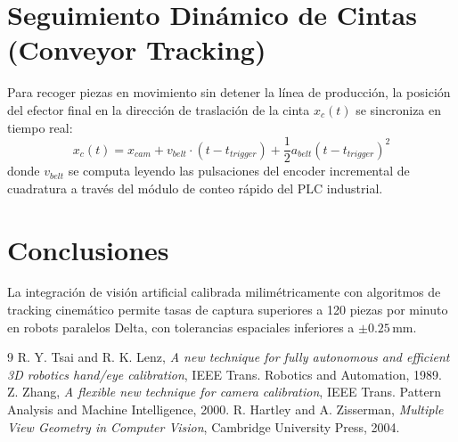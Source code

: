 \documentclass[11pt,a4paper]{article}
\begin{document}
\section{Seguimiento Dinámico de Cintas (Conveyor Tracking)}
Para recoger piezas en movimiento sin detener la línea de producción, la posición del efector final en la dirección de traslación de la cinta $x_c(t)$ se sincroniza en tiempo real:
\begin{equation}
x_c(t) = x_{cam} + v_{belt} \cdot (t - t_{trigger}) + \frac{1}{2} a_{belt} (t - t_{trigger})^2
\end{equation}
donde $v_{belt}$ se computa leyendo las pulsaciones del encoder incremental de cuadratura a través del módulo de conteo rápido del PLC industrial.

\section{Conclusiones}
La integración de visión artificial calibrada milimétricamente con algoritmos de tracking cinemático permite tasas de captura superiores a 120 piezas por minuto en robots paralelos Delta, con tolerancias espaciales inferiores a $\pm 0.25\,\text{mm}$.

\begin{thebibliography}{9}
 R. Y. Tsai and R. K. Lenz, \textit{A new technique for fully autonomous and efficient 3D robotics hand/eye calibration}, IEEE Trans. Robotics and Automation, 1989.
 Z. Zhang, \textit{A flexible new technique for camera calibration}, IEEE Trans. Pattern Analysis and Machine Intelligence, 2000.
 R. Hartley and A. Zisserman, \textit{Multiple View Geometry in Computer Vision}, Cambridge University Press, 2004.
\end{thebibliography}
\end{document}
